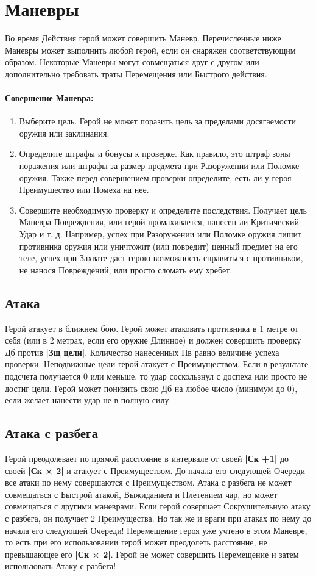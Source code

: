 \section{Маневры}
Во время Действия герой может совершить Маневр. Перечисленные ниже Маневры может выполнить любой герой, если он снаряжен соответствующим образом. Некоторые Маневры могут совмещаться друг с другом или дополнительно требовать траты Перемещения или Быстрого действия.
\paragraph{Совершение Маневра:}
\begin{enumerate}
\item Выберите цель. Герой не может поразить цель за пределами досягаемости оружия или заклинания.
\item Определите штрафы и бонусы к проверке. Как правило, это штраф зоны поражения или штрафы за размер предмета при Разоружении или Поломке оружия. Также перед совершением проверки определите, есть ли у героя Преимущество или Помеха на нее.
\item Совершите необходимую проверку и определите последствия. Получает цель Маневра Повреждения, или герой промахивается, нанесен ли Критический Удар и т. д. Например, успех при Разоружении или Поломке оружия лишит противника оружия или уничтожит (или повредит) ценный предмет на его теле, успех при Захвате даст герою возможность справиться с противником, не нанося Повреждений, или просто сломать ему хребет.
\end{enumerate}
\subsection{Атака}
Герой атакует в ближнем бою. Герой может атаковать противника в 1 метре от себя (или в 2 метрах, если его оружие Длинное) и должен совершить проверку Дб против \textbf{|Зщ цели|}. Количество нанесенных Пв равно величине успеха проверки. Неподвижные цели герой атакует с Преимуществом. Если в результате подсчета получается 0 или меньше, то удар соскользнул с доспеха или просто не достиг цели. Герой может понизить свою Дб на любое число (минимум до 0), если желает нанести удар не в полную силу.
\subsection{Атака с разбега}
Герой преодолевает по прямой расстояние в интервале от своей \textbf{|Ск +1|} до своей \textbf{|Ск × 2|} и атакует с Преимуществом. До начала его следующей Очереди все атаки по нему совершаются с Преимуществом. Атака с разбега не может совмещаться с Быстрой атакой, Выжиданием и Плетением чар, но может совмещаться с другими маневрами. Если герой совершает Сокрушительную атаку с разбега, он получает
2 Преимущества. Но так же и враги при атаках по нему до начала его следующей Очереди!
\newline
Перемещение героя уже учтено в этом Маневре, то есть при его использовании герой может преодолеть расстояние, не превышающее его \textbf{|Ск × 2|}. Герой не может совершить Перемещение и затем использовать Атаку с разбега!
